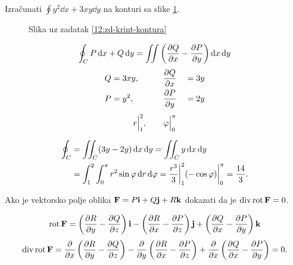 \begin{zadatak}
\label{12:zd-krint-kontura}
Izračunati $\displaystyle \oint y^2 \dd{x} + 3xy \dd{y}$ na konturi sa slike \ref{12:slika-krint-kontura}.
\end{zadatak}

\begin{center}
	\begin{minipage}[t]{0.48\textwidth}
		\begin{figure}[H]
			\centering
			\caption{Slika uz zadatak \ref{12:zd-krint-kontura}}
			\label{12:slika-krint-kontura}
		\end{figure}
	\end{minipage}
	\begin{minipage}[t]{0.48\textwidth}
		\[
		\oint_C P\dd{x} + Q\dd{y} = \iint \left( \pdv{Q}{x} - \pdv{P}{y}  \right) \dd{x} \dd{y}
		\]
		\begin{alignat*}{3}
			Q &= 3xy, \qquad && \pdv{Q}{{x}} &&= 3y \\
			P &= y^2, \qquad && \pdv{P}{{y}} &&= 2y
		\end{alignat*}
		\[
		r\Big|_1^{2}, \qquad \varphi\Big|_0^{\pi}
		\]
	\end{minipage}
\end{center}

\begin{alignat*}{1}
	\oint_C		&= \iint_C (3y-2y) \dd{x} \dd{y} = \iint_C y \dd{x} \dd{y} \\
				&= \int_{1}^{2} \int_{0}^{\pi} r^2 \sin\varphi \dd{r} \dd{ \varphi }
				 = \frac{r^3}{3} \bigg|_1^{2} (- \cos \varphi) \bigg|_0^{\pi} = \frac{14}{3}
.\end{alignat*}

\begin{zadatak}
Ako je vektorsko polje oblika $\vb{F} = P \vb{i} + Q \vb{j} + R \vb{k}$ dokazati da je $\operatorname{div} \operatorname{rot} \vb{F} = 0$.
\end{zadatak}
\[
\operatorname{rot} \vb{F} =	\left( \pdv{R}{y} - \pdv{Q}{z}  \right) \vb{i} -
				\left( \pdv{R}{x} - \pdv{P}{z}  \right) \vb{j} +
				\left( \pdv{Q}{x} - \pdv{P}{y}  \right) \vb{k}
\]
\[
\operatorname{div} \operatorname{rot} \vb{F} =	\pdv{}{x} \left( \pdv{R}{y} - \pdv{Q}{z} \right) -
						\pdv{}{y} \left( \pdv{R}{x} - \pdv{P}{z} \right) +
						\pdv{}{x} \left( \pdv{Q}{x} - \pdv{P}{y} \right) = 0
.\]


